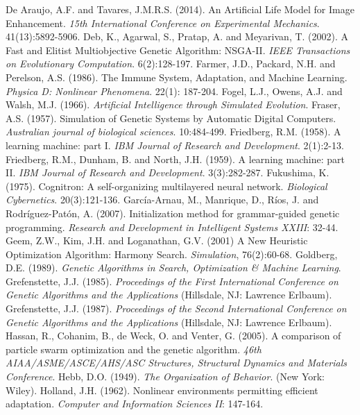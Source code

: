\documentclass[spanish,a4paper,12pt,twoside]{report}
\begin{document}
\begin{thebibliography}{00}
   De Araujo, A.F. and Tavares, J.M.R.S. (2014). An Artificial Life Model for Image Enhancement. \emph{15th International Conference on Experimental Mechanics}. 41(13):5892-5906.
   Deb, K., Agarwal, S., Pratap, A. and Meyarivan, T. (2002). A Fast and Elitist Multiobjective Genetic Algorithm: NSGA-II. \emph{IEEE Transactions on Evolutionary Computation}. 6(2):128-197.
   Farmer, J.D., Packard, N.H. and Perelson, A.S. (1986). The Immune System, Adaptation, and Machine Learning. \emph{Physica D: Nonlinear Phenomena}. 22(1): 187-204.
   Fogel, L.J., Owens, A.J. and Walsh, M.J. (1966). \emph{Artificial Intelligence through Simulated Evolution}.
   Fraser, A.S. (1957). Simulation of Genetic Systems by Automatic Digital Computers. \emph{Australian journal of biological sciences}. 10:484-499.
   Friedberg, R.M. (1958). A learning machine: part I. \emph{IBM Journal of Research and Development}. 2(1):2-13.
   Friedberg, R.M., Dunham, B. and North, J.H. (1959). A learning machine: part II. \emph{IBM Journal of Research and Development}. 3(3):282-287.
   Fukushima, K. (1975). Cognitron: A self-organizing multilayered neural network. \emph{Biological Cybernetics}. 20(3):121-136.
   García-Arnau, M., Manrique, D., Ríos, J. and Rodríguez-Patón, A. (2007). Initialization method for grammar-guided genetic programming. \emph{Research and Development in Intelligent Systems XXIII}: 32-44.
   Geem, Z.W., Kim, J.H. and Loganathan, G.V. (2001) A New Heuristic Optimization Algorithm: Harmony Search. \emph{Simulation}, 76(2):60-68.
   Goldberg, D.E. (1989). \emph{Genetic Algorithms in Search, Optimization \& Machine Learning}.
   Grefenstette, J.J. (1985). \emph{Proceedings of the First International Conference on Genetic Algorithms and the Applications} (Hillsdale, NJ: Lawrence Erlbaum).
   Grefenstette, J.J. (1987). \emph{Proceedings of the Second International Conference on Genetic Algorithms and the Applications} (Hillsdale, NJ: Lawrence Erlbaum).
   Hassan, R., Cohanim, B., de Weck, O. and Venter, G. (2005). A comparison of particle swarm optimization and the genetic algorithm. \emph{46th AIAA/ASME/ASCE/AHS/ASC Structures, Structural Dynamics and Materials Conference}.
   Hebb, D.O. (1949). \emph{The Organization of Behavior}. (New York: Wiley).
   Holland, J.H. (1962). Nonlinear environments permitting efficient adaptation. \emph{Computer and Information Sciences II}: 147-164.

\end{thebibliography}
\end{document}
